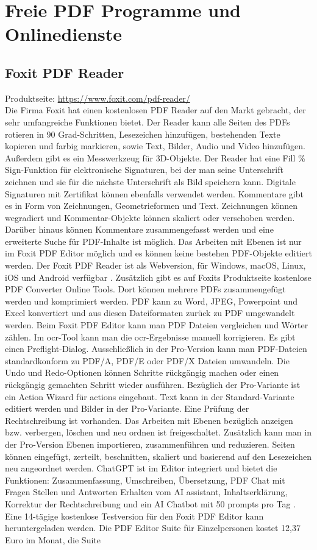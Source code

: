 \section{Freie PDF Programme und Onlinedienste}

\subsection{Foxit PDF Reader}
Produktseite: \url{https://www.foxit.com/pdf-reader/} \\
Die Firma Foxit hat einen kostenlosen PDF Reader auf den Markt gebracht, der sehr umfangreiche Funktionen bietet. Der Reader kann alle Seiten des PDFs rotieren in 90 Grad-Schritten, Lesezeichen hinzufügen, bestehenden Texte kopieren und farbig markieren, sowie Text, Bilder, Audio und Video hinzufügen. Außerdem gibt es ein Messwerkzeug für 3D-Objekte. Der Reader hat eine Fill \% Sign-Funktion für elektronische Signaturen, bei der man seine Unterschrift zeichnen und sie für die nächste Unterschrift als Bild speichern kann. Digitale Signaturen mit Zertifikat können ebenfalls verwendet werden. Kommentare gibt es in Form von Zeichnungen, Geometrieformen und Text. Zeichnungen können wegradiert und Kommentar-Objekte können skaliert oder verschoben werden. Darüber hinaus können Kommentare zusammengefasst werden und eine erweiterte Suche für PDF-Inhalte ist möglich. Das Arbeiten mit Ebenen ist nur im Foxit PDF Editor möglich und es können keine bestehen PDF-Objekte editiert werden. Der Foxit PDF Reader ist als Webversion, für Windows, macOS, Linux, iOS und Android verfügbar \cite{foxit-reader}. Zusätzlich gibt es auf Foxits Produktseite kostenlose PDF Converter Online Tools. Dort können mehrere PDFs zusammengefügt werden und komprimiert werden. PDF kann zu Word, JPEG, Powerpoint und Excel konvertiert und aus diesen Dateiformaten zurück zu PDF umgewandelt werden. Beim Foxit PDF Editor kann man PDF Dateien vergleichen und Wörter zählen. Im \gls{ocr}-Tool kann man die \gls{ocr}-Ergebnisse manuell korrigieren. Es gibt einen Preflight-Dialog. Ausschließlich in der Pro-Version kann man PDF-Dateien standardkonform zu PDF/A, PDF/E oder PDF/X Dateien umwandeln. Die Undo und Redo-Optionen können Schritte rückgängig machen oder einen rückgängig gemachten Schritt wieder ausführen. Bezüglich der Pro-Variante ist ein Action Wizard für actions eingebaut. Text kann in der Standard-Variante editiert werden und Bilder in der Pro-Variante. Eine Prüfung der Rechtschreibung ist vorhanden. Das Arbeiten mit Ebenen bezüglich anzeigen bzw. verbergen, löschen und neu ordnen ist freigeschaltet. Zusätzlich kann man in der Pro-Version Ebenen importieren, zusammenführen und reduzieren. Seiten können eingefügt, zerteilt, beschnitten, skaliert und basierend auf den Lesezeichen neu angeordnet werden. ChatGPT ist im Editor integriert und bietet die Funktionen: Zusammenfassung, Umschreiben, Übersetzung, PDF Chat mit Fragen Stellen und Antworten Erhalten vom AI assistant, Inhaltserklärung, Korrektur der Rechtschreibung und ein AI Chatbot mit 50 prompts pro Tag \cite{foxit-um}. Eine 14-tägige kostenlose Testversion für den Foxit PDF Editor kann heruntergeladen werden. Die PDF Editor Suite für Einzelpersonen kostet 12,37 Euro im Monat, die Suite 